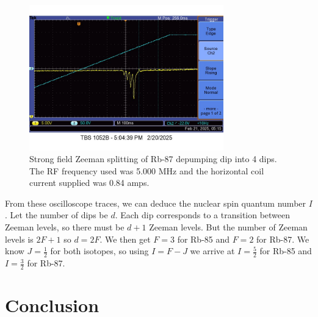 \documentclass[12pt, letterpaper]{article}
\begin{document}
\begin{figure}[!h]
    \centering
    \includegraphics[width=0.75\textwidth]{experiment4/figures/rb87_strong.jpg}
    \caption{Strong field Zeeman splitting of Rb-87 depumping dip into 4 dips. The RF frequency used was 5.000 MHz and the horizontal coil current supplied was 0.84 amps.}
    \label{fig:rb87strong}
\end{figure}

From these oscilloscope traces, we can deduce the nuclear spin quantum number $I$. Let the number of dips be $d$. Each dip corresponds to a transition between Zeeman levels, so there must be $d + 1$ Zeeman levels. But the number of Zeeman levels is $2F + 1$ so $d = 2F$. We then get $F = 3$ for Rb-85 and $F=2$ for Rb-87. We know $J=\frac{1}{2}$ for both isotopes, so using $I = F - J$ we arrive at $I = \frac{5}{2}$ for Rb-85 and $I = \frac{3}{2}$ for Rb-87. 

\section{Conclusion}
\end{document}
